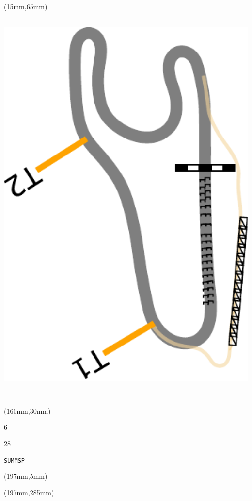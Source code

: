 \begin{textblock*}{185mm}(15mm,65mm)%
\centering
\mbox{\includegraphics[width=185mm,height=210mm,keepaspectratio]{PT/SUMMSP.pdf}}
\end{textblock*}
\begin{textblock*}{40mm}(160mm,30mm)%
\Large
\par{} 
\par6 
\par28 
\par\hfill\tiny\tt SUMMSP\\
\end{textblock*}
\begin{textblock*}{20mm}(197mm,5mm)%
\fbox{\thepage}
\label{SUMMSP}
\end{textblock*}
\begin{textblock*}{20mm}(197mm,285mm)%
\fbox{\thepage}
\end{textblock*}

